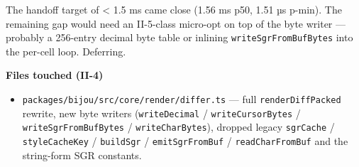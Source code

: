 The handoff target of \textless{} 1.5 ms came close (1.56 ms p50, 1.51 µs p-min). The remaining gap would need an II-5-class micro-opt on top of the byte writer --- probably a 256-entry decimal byte table or inlining \texttt{w\allowbreak{}r\allowbreak{}i\allowbreak{}t\allowbreak{}e\allowbreak{}S\allowbreak{}g\allowbreak{}r\allowbreak{}F\allowbreak{}r\allowbreak{}o\allowbreak{}m\allowbreak{}B\allowbreak{}u\allowbreak{}f\allowbreak{}B\allowbreak{}y\allowbreak{}t\allowbreak{}e\allowbreak{}s} into the per-cell loop. Deferring.

\textbf{Files touched (II-4)}

\begin{itemize}
\tightlist
\item
  \texttt{p\allowbreak{}a\allowbreak{}c\allowbreak{}k\allowbreak{}a\allowbreak{}g\allowbreak{}e\allowbreak{}s\allowbreak{}/\allowbreak{}b\allowbreak{}i\allowbreak{}j\allowbreak{}o\allowbreak{}u\allowbreak{}/\allowbreak{}s\allowbreak{}r\allowbreak{}c\allowbreak{}/\allowbreak{}c\allowbreak{}o\allowbreak{}r\allowbreak{}e\allowbreak{}/\allowbreak{}r\allowbreak{}e\allowbreak{}n\allowbreak{}d\allowbreak{}e\allowbreak{}r\allowbreak{}/\allowbreak{}d\allowbreak{}i\allowbreak{}f\allowbreak{}f\allowbreak{}e\allowbreak{}r\allowbreak{}.\allowbreak{}t\allowbreak{}s} --- full \texttt{r\allowbreak{}e\allowbreak{}n\allowbreak{}d\allowbreak{}e\allowbreak{}r\allowbreak{}D\allowbreak{}i\allowbreak{}f\allowbreak{}f\allowbreak{}P\allowbreak{}a\allowbreak{}c\allowbreak{}k\allowbreak{}e\allowbreak{}d} rewrite, new byte writers (\texttt{w\allowbreak{}r\allowbreak{}i\allowbreak{}t\allowbreak{}e\allowbreak{}D\allowbreak{}e\allowbreak{}c\allowbreak{}i\allowbreak{}m\allowbreak{}a\allowbreak{}l} / \texttt{w\allowbreak{}r\allowbreak{}i\allowbreak{}t\allowbreak{}e\allowbreak{}C\allowbreak{}u\allowbreak{}r\allowbreak{}s\allowbreak{}o\allowbreak{}r\allowbreak{}B\allowbreak{}y\allowbreak{}t\allowbreak{}e\allowbreak{}s} / \texttt{w\allowbreak{}r\allowbreak{}i\allowbreak{}t\allowbreak{}e\allowbreak{}S\allowbreak{}g\allowbreak{}r\allowbreak{}F\allowbreak{}r\allowbreak{}o\allowbreak{}m\allowbreak{}B\allowbreak{}u\allowbreak{}f\allowbreak{}B\allowbreak{}y\allowbreak{}t\allowbreak{}e\allowbreak{}s} / \texttt{w\allowbreak{}r\allowbreak{}i\allowbreak{}t\allowbreak{}e\allowbreak{}C\allowbreak{}h\allowbreak{}a\allowbreak{}r\allowbreak{}B\allowbreak{}y\allowbreak{}t\allowbreak{}e\allowbreak{}s}), dropped legacy \texttt{s\allowbreak{}g\allowbreak{}r\allowbreak{}C\allowbreak{}a\allowbreak{}c\allowbreak{}h\allowbreak{}e} / \texttt{s\allowbreak{}t\allowbreak{}y\allowbreak{}l\allowbreak{}e\allowbreak{}C\allowbreak{}a\allowbreak{}c\allowbreak{}h\allowbreak{}e\allowbreak{}K\allowbreak{}e\allowbreak{}y} / \texttt{b\allowbreak{}u\allowbreak{}i\allowbreak{}l\allowbreak{}d\allowbreak{}S\allowbreak{}g\allowbreak{}r} / \texttt{e\allowbreak{}m\allowbreak{}i\allowbreak{}t\allowbreak{}S\allowbreak{}g\allowbreak{}r\allowbreak{}F\allowbreak{}r\allowbreak{}o\allowbreak{}m\allowbreak{}B\allowbreak{}u\allowbreak{}f} / \texttt{r\allowbreak{}e\allowbreak{}a\allowbreak{}d\allowbreak{}C\allowbreak{}h\allowbreak{}a\allowbreak{}r\allowbreak{}F\allowbreak{}r\allowbreak{}o\allowbreak{}m\allowbreak{}B\allowbreak{}u\allowbreak{}f} and the string-form SGR constants.

\end{itemize}
